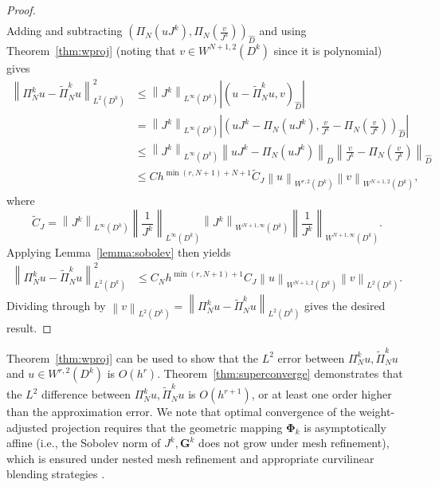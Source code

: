 \documentclass[10pt]{amsart}
\theoremstyle{definition}
\theoremstyle{lemma}
\theoremstyle{theorem}
\theoremstyle{assumption}
\renewcommand{\hat}{\widehat}
\renewcommand{\tilde}{\widetilde}
\newcommand{\nor}[1]{\left\| #1 \right\|}
\newcommand{\LRp}[1]{\left( #1 \right)}
\newcommand{\LRb}[1]{\left| #1 \right|}
\begin{document}
{\begin{proof}
\begin{align*}
\end{align*}
Adding and subtracting $\LRp{\Pi_N\LRp{uJ^k},\Pi_N\LRp{\frac{v}{J^k}}}_{\hat{D}}$ and using Theorem~\ref{thm:wproj} (noting that $v\in W^{N+1,2}\LRp{D^k}$ since it is polynomial) gives
\begin{align*}
\nor{\Pi^k_Nu-\tilde{\Pi}^k_Nu}_{L^2\LRp{D^k}}^2 &\leq \nor{J^k}_{L^{\infty}\LRp{D^k}}\LRb{\LRp{u-\tilde{\Pi}^k_Nu,v}_{\hat{D}}}\\
&= \nor{J^k}_{L^{\infty}\LRp{D^k}}\LRb{\LRp{uJ^k - \Pi_N\LRp{uJ^k},\frac{v}{J^k}-\Pi_N\LRp{\frac{v}{J^k}}}_{\hat{D}}} \\
&\leq \nor{J^k}_{L^{\infty}\LRp{D^k}}\nor{uJ^k - \Pi_N\LRp{uJ^k}}_{\hat{D}}\nor{\frac{v}{J^k}-\Pi_N\LRp{\frac{v}{J^k}}}_{\hat{D}}\\
&\leq C h^{\min\LRp{r,N+1}+N+1} \tilde{C}_J \nor{u}_{W^{r,2}\LRp{D^k}} \nor{v}_{W^{N+1,2}\LRp{D^k}},
\end{align*}
where 
\[
\tilde{C}_J = \nor{J^k}_{L^{\infty}\LRp{D^k}}\nor{\frac{1}{J^k}}_{L^{\infty}\LRp{D^k}} \nor{J^k}_{W^{N+1,\infty}\LRp{D^k}}\nor{\frac{1}{J^k}}_{W^{N+1,\infty}\LRp{D^k}}.
\]
Applying Lemma~\ref{lemma:sobolev} then yields
\begin{align*}
\nor{\Pi^k_Nu-\tilde{\Pi}^k_Nu}_{L^2\LRp{D^k}}^2 &\leq C_N h^{\min\LRp{r,N+1}+1} C_J \nor{u}_{W^{N+1,2}\LRp{D^k}} \nor{v}_{L^2\LRp{D^k}}.
\end{align*}
Dividing through by $\nor{v}_{L^2\LRp{D^k}} = \nor{\Pi^k_N u - \tilde{\Pi}^k_N  u}_{L^2\LRp{D^k}}$ gives the desired result.  %
\end{proof}
Theorem~\ref{thm:wproj} can be used to show that the $L^2$ error between $\Pi^k_N u, \tilde{\Pi}^k_N u$ and $u \in W^{r,2}\LRp{D^k}$ is $O(h^r)$.  Theorem~\ref{thm:superconverge} demonstrates that the $L^2$ difference between $\Pi^k_N u, \tilde{\Pi}^k_N u$ is $O(h^{r+1})$, or at least one order higher than the approximation error.  We note that optimal convergence of the weight-adjusted projection requires that the geometric mapping $\bm{\Phi}_k$ is asymptotically affine (i.e., the Sobolev norm of $J^k, \bm{G}^k$ does not grow under mesh refinement), which is ensured under nested mesh refinement and appropriate curvilinear blending strategies \cite{lenoir1986optimal, warburton2013low, chan2016weight2}.  

}
\end{document}
